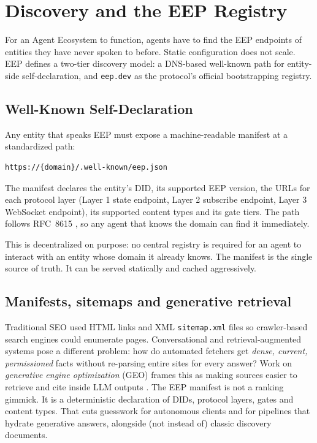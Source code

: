 \documentclass[12pt,a4paper]{article}
\begin{document}
\section{Discovery and the EEP Registry}

For an Agent Ecosystem to function, agents have to find the EEP endpoints of entities they have never spoken to before. Static configuration does not scale. EEP defines a two-tier discovery model: a DNS-based well-known path for entity-side self-declaration, and \texttt{eep.dev} as the protocol's official bootstrapping registry.

\subsection{Well-Known Self-Declaration}

Any entity that speaks EEP must expose a machine-readable manifest at a standardized path:

\begin{lstlisting}[language=EEPJson,style=eepcode]
https://{domain}/.well-known/eep.json
\end{lstlisting}

The manifest declares the entity's DID, its supported EEP version, the URLs for each protocol layer (Layer 1 state endpoint, Layer 2 subscribe endpoint, Layer 3 WebSocket endpoint), its supported content types and its gate tiers. The path follows RFC~8615 \cite{ref20}, so any agent that knows the domain can find it immediately.

This is decentralized on purpose: no central registry is required for an agent to interact with an entity whose domain it already knows. The manifest is the single source of truth. It can be served statically and cached aggressively.

\subsection{Manifests, sitemaps and generative retrieval}

Traditional SEO used HTML links and XML \texttt{sitemap.xml} files so crawler-based search engines could enumerate pages. Conversational and retrieval-augmented systems pose a different problem: how do automated fetchers get \emph{dense, current, permissioned} facts without re-parsing entire sites for every answer? Work on \emph{generative engine optimization} (GEO) frames this as making sources easier to retrieve and cite inside LLM outputs \cite{ref33}. The EEP manifest is not a ranking gimmick. It is a deterministic declaration of DIDs, protocol layers, gates and content types. That cuts guesswork for autonomous clients and for pipelines that hydrate generative answers, alongside (not instead of) classic discovery documents.
\end{document}
